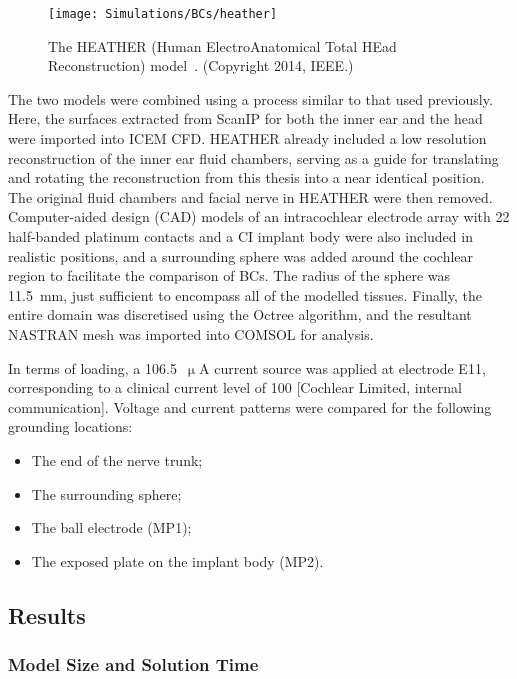 \begin{figure}
	\centering
	\texttt{[image: Simulations/BCs/heather]}
	\caption[The HEATHER model]{The HEATHER (Human ElectroAnatomical Total HEad
	Reconstruction) model~\cite{tran2015}. (Copyright \textcopyright{} 2014,
	IEEE.)}
	\label{fig:heather}
\end{figure}

The two models were combined using a process similar to that used previously.
Here, the surfaces extracted from ScanIP for both the inner ear and the head
were imported into ICEM CFD. HEATHER already included a low resolution
reconstruction of the inner ear fluid chambers, serving as a guide for
translating and rotating the reconstruction from this thesis into a near
identical position. The original fluid chambers and facial nerve in HEATHER were
then removed. Computer-aided design (CAD) models of an intracochlear electrode
array with 22 half-banded platinum contacts and a CI implant body were also
included in realistic positions, and a surrounding sphere was added around the
cochlear region to facilitate the comparison of BCs. The radius of the sphere
was 11.5~mm, just sufficient to encompass all of the modelled tissues. Finally,
the entire domain was discretised using the Octree algorithm, and the resultant
NASTRAN mesh was imported into COMSOL for analysis.

In terms of loading, a 106.5~$ \upmu $A current source was applied at electrode
E11, corresponding to a clinical current level of 100 [Cochlear Limited,
internal communication]. Voltage and current patterns were compared for the
following grounding locations:
\begin{itemize}
    \item The end of the nerve trunk;
    \item The surrounding sphere;
    \item The ball electrode (MP1);
    \item The exposed plate on the implant body (MP2).
\end{itemize}

\subsection{Results}

\subsubsection{Model Size and Solution Time}

